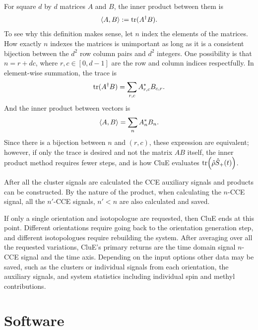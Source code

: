 \documentclass{book}
\begin{document}
For square $d$ by $d$ matrices $A$ and $B$, the inner product between them is
%
\begin{equation}
\braket{A,B} := \text{tr}(A^\dagger B).
\end{equation}
%
To see why this definition makes sense, let $n$ index the elements of the
matrices.  How exactly $n$ indexes the matrices is unimportant as long as it is 
a consistent bijection between the $d^2$ row column pairs and $d^2$ integers.
One possibility is that $n = r + dc$, where $r,c\in [0,d-1]$ 
are the row and column indices respectfully.  In element-wise summation, the
trace is
%
\begin{equation}
\text{tr}(A^\dagger B) = \sum_{r,c} A_{r,c}^{*}B_{c,r}
.
\end{equation}
%
And the inner product between vectors is 
%
\begin{equation}
\braket{A,B} = \sum_{n} A_{n}^{*}B_{n}
.
\end{equation}
%
Since there is a bijection between $n$ and $(r,c)$, 
these expression are equivalent; however, if only the trace is desired and not
the matrix $AB$ itself, the inner product method requires fewer steps, 
and is how CluE evaluates $\text{tr}\Big(\hat{\rho} \hat{S}_{+}(t)\Big)$.

After all the cluster signals are calculated the CCE auxiliary signals and 
products can be constructed.  By the nature of the product, when calculating 
the $n$-CCE signal, all the $n'$-CCE signals, $n'<n$ are also calculated and 
saved.

If only a single orientation and isotopologue are requested, then CluE ends 
at this point.  Different orientations require going back to the orientation
generation step, and different isotopologues require rebuilding the system.
After averaging over all the requested variations, CluE's primary returns are
the time domain signal $n$-CCE signal and the time axis.  Depending on the 
input options other data may be saved, such as the clusters or 
individual signals from each orientation, the auxiliary signals, 
and system statistics including individual spin and methyl contributions.  
\section{Software}

\end{document}
